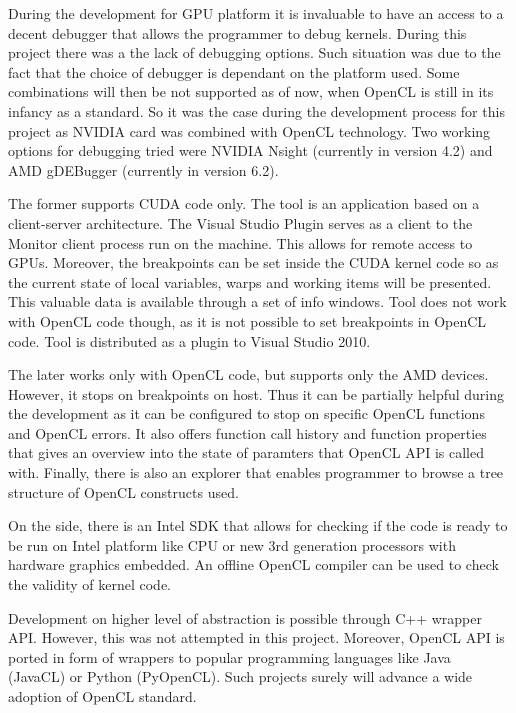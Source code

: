 During the development for GPU platform it is invaluable to have an access to a decent debugger that allows the programmer to debug kernels. During this project there was a the lack of debugging options. Such situation was due to the fact that the choice of debugger is dependant on the platform used. Some combinations will then be not supported as of now, when OpenCL is still in its infancy as a standard. So it was the case during the development process for this project as NVIDIA card was combined with OpenCL technology.  Two working options for debugging tried were NVIDIA Nsight (currently in version 4.2) and AMD gDEBugger (currently in version 6.2).

The former supports CUDA code only. The tool is an application based on a client-server architecture.  The Visual Studio Plugin serves as a client to the Monitor client process run on the machine. This allows for remote access to GPUs. Moreover, the breakpoints can be set inside the CUDA kernel code so as the current state of local variables, warps and working items will be presented. This valuable data is available through a set of info windows. Tool does not work with OpenCL code though, as it is not possible to set breakpoints in OpenCL code. Tool is distributed as a plugin to Visual Studio 2010.

The later works only with OpenCL code, but supports only the AMD devices. However, it stops on breakpoints on host. Thus it can be partially helpful during the development as it can be configured to stop on specific OpenCL functions and OpenCL errors. It also offers function call history and function properties that gives an overview into the state of paramters that OpenCL API is called with. Finally, there is also an explorer that enables programmer to browse a tree structure of OpenCL constructs used.

On the side, there is an Intel SDK that allows for checking if the code is ready to be run on Intel platform like CPU or new 3rd generation processors with hardware graphics embedded. An offline OpenCL compiler can be used to check the validity of kernel code. 

Development on higher level of abstraction is possible through C++ wrapper API. However, this was not attempted in this project. Moreover, OpenCL API is ported in form of wrappers to popular programming languages like Java (JavaCL) or Python (PyOpenCL). Such projects surely will advance a wide adoption of OpenCL standard. 


